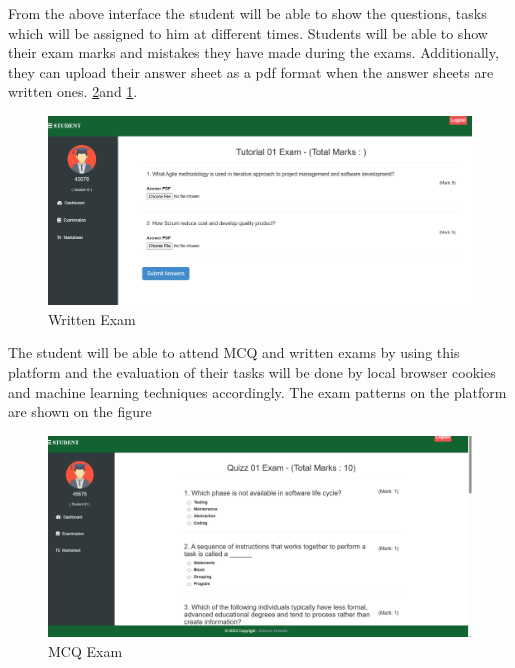 From the above interface the student will be able to show the questions, tasks which will be assigned to him at different times. Students will be able to show their exam marks and mistakes they have made during the exams. Additionally, they can upload their answer sheet as a pdf format when the answer sheets are written ones.
\ref{fig:stMCQ}and \ref{fig:stCT}.
\begin{figure}[H]
    \centering
    \includegraphics[scale=.35]{img/stCT.png}
    \caption{Written Exam}
    \label{fig:stCT}
\end{figure}
The student will be able to attend MCQ and written exams by using this platform and the evaluation of their tasks will be done by local browser cookies and machine learning techniques accordingly. The exam patterns on the platform are shown on the figure 
\begin{figure}[H]
    \centering
    \includegraphics[scale=.35]{img/stMCQ.png}
    \caption{MCQ Exam}
    \label{fig:stMCQ}
\end{figure}

